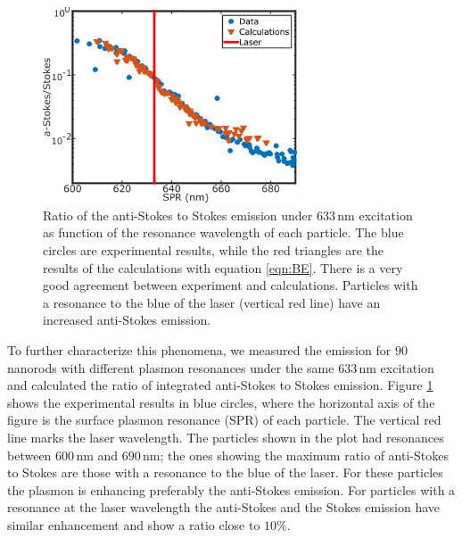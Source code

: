 \documentclass[journal=nalefd,manuscript=letter]{achemso}
\newcommand{\nm}{\ensuremath{\,\textrm{nm}}}
\begin{document}
\begin{figure}[tp] \centering
\includegraphics[width=75.5mm]{Figures/Supplementary/02_AS_vs_S_SPR/02_AS_vs_S_SPR.png}
\caption{Ratio of the anti-Stokes to Stokes emission under $633\nm$ excitation
as function of the resonance wavelength of each particle.
The blue circles are experimental results, while the red triangles are the
results of the calculations with equation \ref{eqn:BE}. There is a very
good agreement between experiment and calculations. Particles with a resonance
to the blue of the laser (vertical red line) have an increased anti-Stokes
emission.}
	\label{fig:ASS-ratio}
\end{figure}

To further characterize this phenomena, we measured the emission for $90$ 
nanorods with different plasmon resonances under the same $633\nm$
excitation and calculated the ratio of integrated anti-Stokes to Stokes emission.
Figure \ref{fig:ASS-ratio} shows the experimental results in blue circles, 
where the horizontal axis of the 
figure is the surface plasmon resonance (SPR) of each particle. The vertical red
line marks the laser wavelength. The particles shown in the plot had resonances
between $600\nm$ and $690\nm$; the ones showing the maximum ratio of anti-Stokes
to Stokes are those with a resonance to the blue of the laser. For these
particles the plasmon is enhancing preferably the anti-Stokes emission. For
particles with a resonance at the laser wavelength the anti-Stokes and the
Stokes emission have similar enhancement and show a ratio close to $10\%$. 
\end{document}
